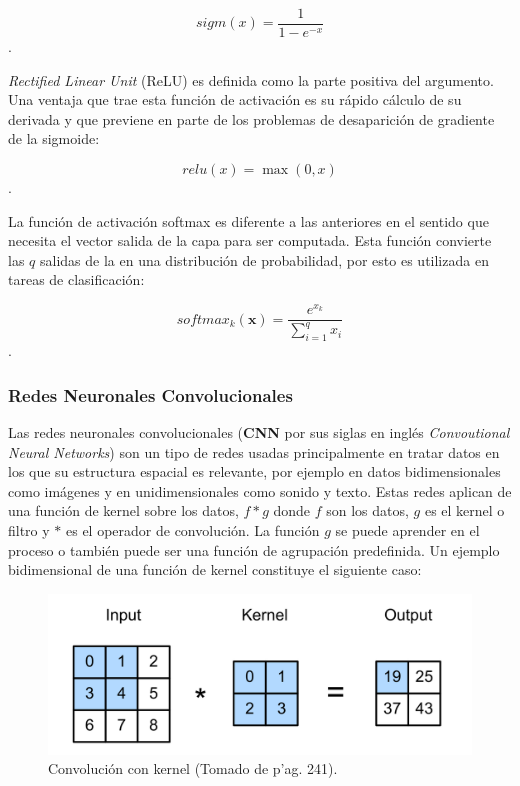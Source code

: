\begin{equation}
	sigm(x) = \frac{1}{1-e^{-x}}
\end{equation}\label{eq:sigmoide}.

\emph{Rectified Linear Unit} (ReLU) es definida como la parte positiva del argumento. Una ventaja que trae esta 
función de activación es su rápido cálculo de su derivada y que previene en parte de los problemas 
de desaparición de gradiente de la sigmoide:

\begin{equation}
	relu(x) = \max(0, x)
\end{equation}\label{eq:relu}.

La función de activación softmax es diferente a las anteriores en el sentido que necesita
el vector salida de la capa para ser computada. Esta función convierte las $q$ salidas
de la en una distribución de probabilidad, por esto es utilizada en tareas de clasificación:

\begin{equation}
	softmax_k(\textbf{x}) = \frac{e^{x_k}}{\sum_{i=1}^q x_i}
\end{equation}\label{eq:softmax}.

\subsubsection{Redes Neuronales Convolucionales}

Las redes neuronales convolucionales (\textbf{CNN} por sus siglas en inglés \emph{Convoutional Neural Networks}) 
son un tipo de redes usadas
principalmente en tratar datos en los que su estructura espacial es relevante, por ejemplo
en datos bidimensionales como imágenes y en unidimensionales como sonido y texto.
Estas redes aplican de una función de kernel sobre los datos, $f * g$ donde $f$ son los
datos, $g$ es el kernel o filtro y $*$ es el operador de convolución. La función $g$ se puede 
aprender en el proceso o también puede ser una función de agrupación predefinida. 
Un ejemplo bidimensional de una función de kernel constituye el siguiente caso:

\begin{figure}[h!]
	\begin{center}
		\begin{center}
			\includegraphics[scale=.3]{Graphics/kernel_convolution.png}
        \end{center}
	    \caption{Convolución con kernel (Tomado de \cite{d2l} p'ag. 241).}\label{fig:conv_kernel}
	\end{center}
\end{figure}

